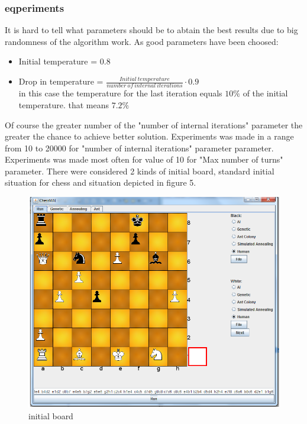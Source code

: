 \documentclass[pdftex]{article}
\begin{document}
\subsubsection{eqperiments}
It is hard to tell what parameters should be to abtain the best results due to big randomness of the algorithm work. As good parameters have been choosed:
\begin{itemize}
	\item Initial temperature = 0.8 \hfill \\

 	\item Drop in temperature = $\frac{Initial \: temperature}{number \: of \: internal \: iterations} \cdot 0.9$ \hfill \\
 	
in this case the temperature for the last iteration equals $10\%$ of the initial temperature. that means $7.2\%$
\end{itemize}
Of course the greater number of the "number of internal iterations" parameter the greater the chance to achieve better solution. Experiments was made in a range from 10 to 20000 for "number of internal iterations" parameter parameter.
Experiments was made most often for value of 10 for "Max number of turns" parameter. There were considered 2 kinds of initial board, standard initial situation for chess and situation depicted in figure 5.

\begin{figure}[!htb]
	\centering
	\includegraphics[width=1.0\textwidth]{annealing/board.png} 
	\caption{initial board}
	\label{fig:annealingTab}
\end{figure}
\clearpage
\end{document}
